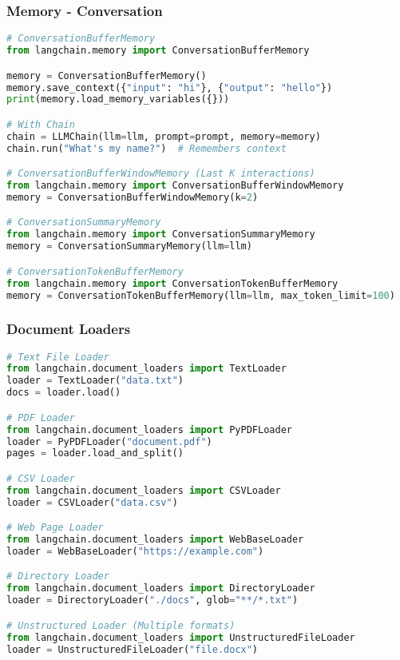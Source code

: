 \begin{frame}[fragile]\frametitle{Memory - Conversation}
\begin{lstlisting}[language=python,basicstyle=\tiny]
# ConversationBufferMemory
from langchain.memory import ConversationBufferMemory

memory = ConversationBufferMemory()
memory.save_context({"input": "hi"}, {"output": "hello"})
print(memory.load_memory_variables({}))

# With Chain
chain = LLMChain(llm=llm, prompt=prompt, memory=memory)
chain.run("What's my name?")  # Remembers context

# ConversationBufferWindowMemory (Last K interactions)
from langchain.memory import ConversationBufferWindowMemory
memory = ConversationBufferWindowMemory(k=2)

# ConversationSummaryMemory
from langchain.memory import ConversationSummaryMemory
memory = ConversationSummaryMemory(llm=llm)

# ConversationTokenBufferMemory
from langchain.memory import ConversationTokenBufferMemory
memory = ConversationTokenBufferMemory(llm=llm, max_token_limit=100)
\end{lstlisting}
\end{frame}

\begin{frame}[fragile]\frametitle{Document Loaders}
\begin{lstlisting}[language=python,basicstyle=\tiny]
# Text File Loader
from langchain.document_loaders import TextLoader
loader = TextLoader("data.txt")
docs = loader.load()

# PDF Loader
from langchain.document_loaders import PyPDFLoader
loader = PyPDFLoader("document.pdf")
pages = loader.load_and_split()

# CSV Loader
from langchain.document_loaders import CSVLoader
loader = CSVLoader("data.csv")

# Web Page Loader
from langchain.document_loaders import WebBaseLoader
loader = WebBaseLoader("https://example.com")

# Directory Loader
from langchain.document_loaders import DirectoryLoader
loader = DirectoryLoader("./docs", glob="**/*.txt")

# Unstructured Loader (Multiple formats)
from langchain.document_loaders import UnstructuredFileLoader
loader = UnstructuredFileLoader("file.docx")
\end{lstlisting}
\end{frame}

